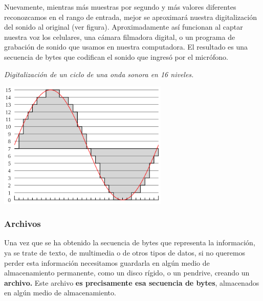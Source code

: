 \documentclass[a4paper]{article}
\begin{document}
Nuevamente, mientras más muestras por segundo y más valores
diferentes reconozcamos en el rango de entrada, mejor se aproximará
nuestra digitalización del sonido al original (ver figura).
Aproximadamente así funcionan al captar nuestra voz los celulares,
una cámara filmadora digital, o un programa de grabación de sonido
que usamos en nuestra computadora. El resultado es una secuencia de
bytes que codifican el sonido que ingresó por el micrófono.


\bigskip



\begin{center}
\begin{minipage}{17cm}



{\raggedleft\itshape
Digitalización de un ciclo de una \newline
onda sonora en 16 niveles.
\par}


\includegraphics[width=8.098cm,height=6.073cm]{IC2020Codificacion20de20datos-img4.png}

\end{minipage}
\end{center}

\bigskip

\subsubsection{Archivos}
Una vez que se ha obtenido la secuencia de bytes que representa la
información, ya se trate de texto, de multimedia o de otros tipos de
datos, si no queremos perder esta información necesitamos guardarla
en algún medio de almacenamiento permanente, como un disco rígido,
o un pendrive, creando un \textbf{archivo.} Este archivo \textbf{es
precisamente esa secuencia de bytes}, almacenados en algún medio de
almacenamiento.
\end{document}
